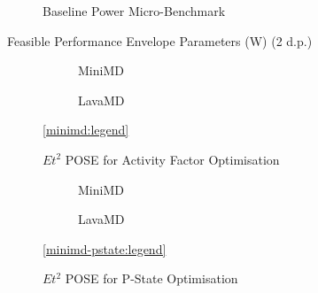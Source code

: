 
\begin{figure}[ht]                                                               
\centering                                                                      
\lstset{basicstyle=\ttfamily\footnotesize\bfseries, frame=tb} %
              
\caption{Baseline Power Micro-Benchmark}                            
\label{fig:microbench}                                                           
\end{figure}  


\begin{table}
\centering
\caption{Feasible Performance Envelope Parameters (W) (2 d.p.)}

\end{table} 

\begin{figure}[t]%
	\providecommand{\plotwidth}{.95\linewidth}
  \begin{subfigure}[t]{.5\linewidth}%
    \caption{MiniMD}%
  \end{subfigure}%
  \begin{subfigure}[t]{.5\linewidth}%
    \caption{LavaMD}%
  \end{subfigure}%
  \begin{center}%
    \ref{minimd:legend}%
  \end{center}%
  \caption{$Et^2$ POSE for Activity Factor Optimisation}%
  \label{fig:minimd}%
\end{figure}

\begin{figure}[t]%
\begin{subfigure}[t]{.5\linewidth}%
\centering%
%
\caption{MiniMD}%
\end{subfigure}%
\begin{subfigure}[t]{.5\linewidth}%
%
\caption{LavaMD}%
\end{subfigure}%
\begin{center}%
\ref{minimd-pstate:legend}%
\end{center}%
\caption{$Et^2$ POSE for P-State Optimisation}%
\label{fig:pstates}%
\end{figure}%

